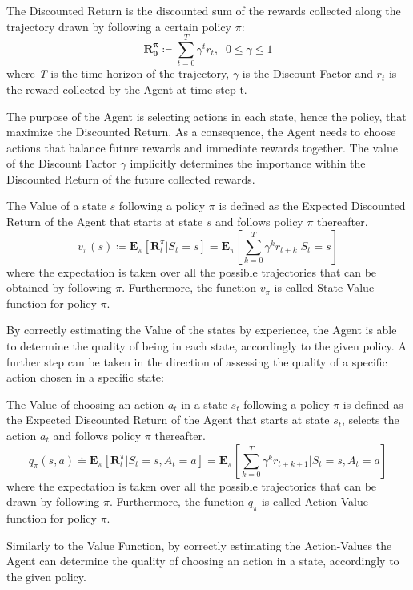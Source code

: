             \begin{definition}
                \label{def:return}
                The Discounted Return is the discounted sum of the rewards collected along the trajectory drawn by following a certain policy $\pi$:
                \[ \mathbf{R_{0}^{\pi}} \coloneqq \sum_{t=0}^{T} \gamma^{t} r_t,  \;\; 0 \leq \gamma \leq 1  \]
                where \textit{T} is the time horizon of the trajectory, $\gamma$ is the Discount Factor and $r_t$ is the reward collected by the Agent at time-step t.
            \end{definition}
            \noindent
            The purpose of the Agent is selecting actions in each state, hence the policy, that maximize the Discounted Return. As a consequence, the Agent needs to choose actions that balance future rewards and immediate rewards together. The value of the Discount Factor $\gamma$ implicitly determines the importance within the Discounted Return of the future collected rewards.
            
            \begin{definition}
                \label{def:valuefun}
                The Value of a state $s$ following a policy $\pi$ is defined as the Expected Discounted Return of the Agent that starts at state $s$ and follows policy $\pi$ thereafter. 
                \[ v_{\pi}\left(s\right) \coloneqq \mathbf{E}_{\pi} \left[ \mathbf{R}_{t}^{\pi} | S_{t}=s\right] = \mathbf{E}_{\pi} \left[ \sum_{k=0}^T \gamma^k r_{t + k} | S_{t}=s\right] \]
                where the expectation is taken over all the possible trajectories that can be obtained by following $\pi$.
                Furthermore, the function $v_{\pi}$ is called State-Value function for policy $\pi$.
            \end{definition}
            \noindent
            By correctly estimating the Value of the states by experience, the Agent is able to determine the quality of being in each state, accordingly to the given policy. A further step can be taken in the direction of assessing the quality of a specific action chosen in a specific state:
            
            \begin{definition}
                \label{def:actionvaluefun}
                The Value of choosing an action $a_t$ in a state $s_t$ following a policy $\pi$ is defined as the Expected Discounted Return of the Agent that starts at state $s_t$, selects the action $a_t$ and follows policy $\pi$ thereafter. 
                \[ q_{\pi}\left(s,a\right) \doteq \mathbf{E}_{\pi} \left[ \mathbf{R}_{t}^{\pi} | S_{t}=s, A_{t}=a\right] = \mathbf{E}_{\pi} \left[ \sum_{k=0}^T \gamma^k r_{t + k + 1} | S_{t}=s, A_{t}=a\right]\]
                where the expectation is taken over all the possible trajectories that can be drawn by following $\pi$.
                Furthermore, the function $q_{\pi}$ is called Action-Value function for policy $\pi$.
            \end{definition}
            \noindent
            Similarly to the Value Function, by correctly estimating the Action-Values the Agent can determine the quality of choosing an action in a state, accordingly to the given policy. 
            
